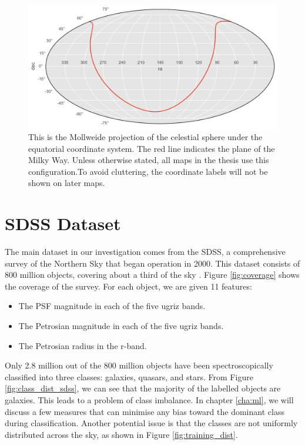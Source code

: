 \begin{figure}[tbp]
	\centering
	\includegraphics[width=\textwidth]{figures/map_mollweide}
	\caption[The Mollweide projection of the celestial sphere]{This is the Mollweide projection
		of the celestial sphere under the equatorial coordinate system. The red line indicates
		the plane of the Milky Way. Unless otherwise stated, all maps in the thesis use this
		configuration.To avoid cluttering, the coordinate labels will not be shown on later maps.}
	\label{fig:mollweide} 
\end{figure}

\section{SDSS Dataset}
\label{sec:datasets}
The main dataset in our investigation comes from the SDSS, a comprehensive survey of the
Northern Sky that began operation in 2000. This dataset consists of 800 million objects, covering
about a third of the sky \cite{alam15}. Figure \ref{fig:coverage} shows the coverage of the survey.
For each object, we are given 11 features:
	\begin{itemize}
		\item The PSF magnitude in each of the five ugriz bands.
		\item The Petrosian magnitude in each of the five ugriz bands.
		\item The Petrosian radius in the r-band.
	\end{itemize}
Only 2.8 million out of the 800 million objects have been spectroscopically classified into three
classes: galaxies, quasars, and stars. From Figure
\ref{fig:class_dist_sdss}, we can see that the majority of the labelled objects are galaxies. This leads to
a problem of class imbalance. In chapter
\ref{cha:ml}, we will discuss a few measures that can minimise any bias toward the
dominant class during classification. Another potential issue is that the classes
are not uniformly distributed across the sky, as shown in Figure \ref{fig:training_dist}.



